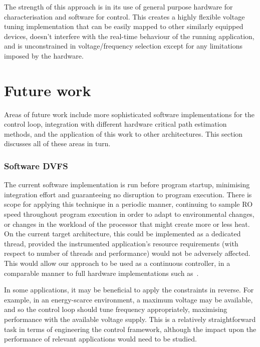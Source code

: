 \documentclass[a4paper,twocolumn,DIV=16]{scrartcl}
\begin{document}
The strength of this approach is in its use of general purpose hardware for
characterisation and software for control. This creates a highly flexible
voltage tuning implementation that can be easily mapped to other similarly
equipped devices, doesn't interfere with the real-time behaviour of the running
application, and is unconstrained in voltage/frequency selection except for any
limitations imposed by the hardware. 


\section{Future work}
\label{sec:future}

Areas of future work include more sophisticated software implementations for the
control loop, integration with different hardware critical path estimation
methods, and the application of this work to other architectures. This section
discusses all of these areas in turn.

\subsubsection*{Software DVFS}

The current software implementation is run before program startup, minimising
integration effort and guaranteeing no disruption to program execution. There is
scope for applying this technique in a periodic manner, continuing to sample RO
speed throughout program execution in order to adapt to environmental changes,
or changes in the workload of the processor that might create more or less heat.
On the current target architecture, this could be implemented as a dedicated
thread, provided the instrumented application's resource requirements (with
respect to number of threads and performance) would not be adversely affected.
This would allow our approach to be used as a continuous controller, in a
comparable manner to full hardware implementations such as~\cite{burd2000scaled,
das2006dvstuning, Liu2010}.

In some applications, it may be beneficial to apply the constraints in reverse.
For example, in an energy-scarce environment, a maximum voltage may be
available, and so the control loop should tune frequency appropriately,
maximising performance with the available voltage supply. This is a relatively
straightforward task in terms of engineering the control framework, although the
impact upon the performance of relevant applications would need to be studied.
\end{document}
